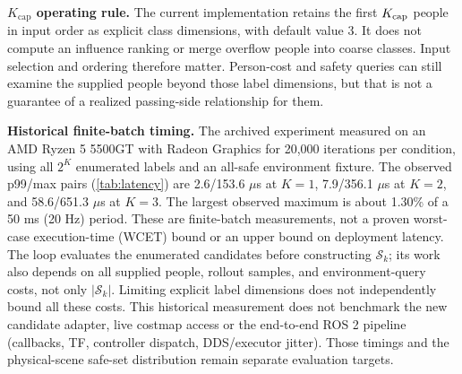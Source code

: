 \noindent\textbf{$K_{\text{cap}}$ operating rule.} The current implementation retains the first $K_{\rm cap}$ people in input order as explicit class dimensions, with default value 3. It does not compute an influence ranking or merge overflow people into coarse classes. Input selection and ordering therefore matter. Person-cost and safety queries can still examine the supplied people beyond those label dimensions, but that is not a guarantee of a realized passing-side relationship for them.

\noindent\textbf{Historical finite-batch timing.} The archived  experiment measured  on an AMD Ryzen 5 5500GT with Radeon Graphics for 20,000 iterations per condition, using all $2^K$ enumerated labels and an all-safe environment fixture. The observed p99/max pairs (\cref{tab:latency}) are 2.6/153.6 $\mu$s at $K=1$, 7.9/356.1 $\mu$s at $K=2$, and 58.6/651.3 $\mu$s at $K=3$. The largest observed maximum is about 1.30\% of a 50 ms (20 Hz) period. These are finite-batch measurements, not a proven worst-case execution-time (WCET) bound or an upper bound on deployment latency. The loop evaluates the enumerated candidates before constructing $\mathcal{S}_k$; its work also depends on all supplied people, rollout samples, and environment-query costs, not only $|\mathcal{S}_k|$. Limiting explicit label dimensions does not independently bound all these costs. This historical measurement does not benchmark the new candidate adapter, live costmap access or the end-to-end ROS 2 pipeline (callbacks, TF, controller dispatch, DDS/executor jitter). Those timings and the physical-scene safe-set distribution remain separate evaluation targets.
